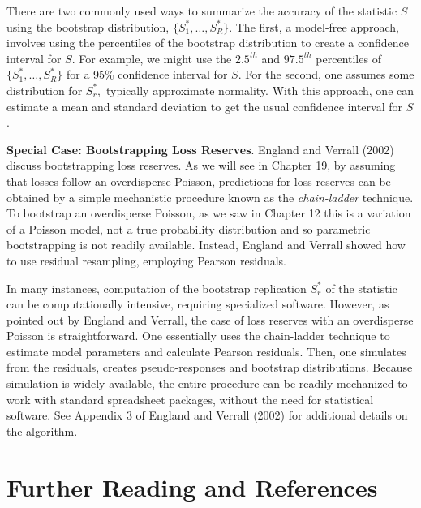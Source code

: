 There are two commonly used ways to summarize the accuracy of the
statistic $S$ using the bootstrap distribution, $\{S^{\ast}_1,
\ldots, S^{\ast}_R\}$. The first, a model-free approach, involves
using the percentiles of the bootstrap distribution to create a
confidence interval for $S$. For example, we might use the
$2.5^{th}$ and  $97.5^{th}$ percentiles of $\{S^{\ast}_1, \ldots,
S^{\ast}_R\}$ for a 95\% confidence interval for $S$. For the
second, one assumes some distribution for $S^{\ast}_r,$ typically
approximate normality. With this approach, one can estimate a mean
and standard deviation to get the usual confidence interval for $S$.

\linejed{}

\textbf{Special Case: Bootstrapping Loss Reserves}. England and
Verrall (2002) discuss bootstrapping loss reserves. As we will see
in Chapter 19, by assuming that losses follow an overdisperse
Poisson, predictions for loss reserves can be obtained by a simple
mechanistic procedure known as the \emph{chain-ladder} technique. To
bootstrap an overdisperse Poisson, as we saw in Chapter 12 this is a
variation of a Poisson model, not a true probability distribution
and so parametric bootstrapping is not readily available. Instead,
England and Verrall showed how to use residual resampling, employing
Pearson residuals.

In many instances, computation of the bootstrap replication
$S^{\ast}_r$ of the statistic can be computationally intensive,
requiring specialized software. However, as pointed out by England
and Verrall, the case of loss reserves with an overdisperse Poisson
is straightforward. One essentially uses the chain-ladder technique
to estimate model parameters and calculate Pearson residuals. Then,
one simulates from the residuals, creates pseudo-responses and
bootstrap distributions. Because simulation is widely available, the
entire procedure can be readily mechanized to work with standard
spreadsheet packages, without the need for statistical software. See
Appendix 3 of England and Verrall (2002) for additional details on
the algorithm.



\linejed






\bigskip


\section{Further Reading and References}

